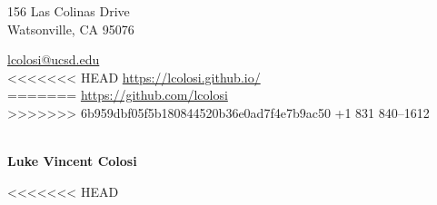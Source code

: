 \documentclass[10pt]{article}
\begin{document}
\pagestyle{empty}
\begin{minipage}[ht]{0.48\textwidth}
\begin{flushleft}
\small{156 Las Colinas Drive} \\
\small{Watsonville, CA 95076} \\
\end{flushleft}
\end{minipage}
\hfill
\begin{minipage}[ht]{0.48\textwidth}
\begin{flushright}
\noindent \href{mailto:lcolosi@ucsd.edu}{lcolosi@ucsd.edu} \ \ \ \ \ \ \ \ \ \ \ \ \ \ \ \ \ \ \ \   \\
<<<<<<< HEAD
{\url{https://lcolosi.github.io/} }\\
=======
{\url{https://github.com/lcolosi} }\\
>>>>>>> 6b959dbf05f5b180844520b36e0ad7f4e7b9ac50
\small{+1 831 840--1612} \ \ \ \ \ \ \ \ \ \ \ \ \ \ \ \ \  \ \ \ \ \ \ \     \\
\end{flushright}
\end{minipage}


\vspace{.5cm}
\begin{center}
	{\bfseries\Huge Luke Vincent Colosi}
\end{center}
\vspace{.5cm}

<<<<<<< HEAD
\end{document}
